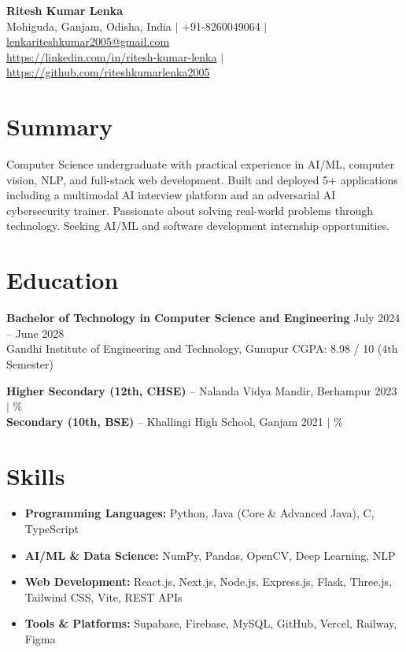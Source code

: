 \documentclass[a4paper,10pt]{article}
\begin{document}
\begin{center}
    {\LARGE \textbf{Ritesh Kumar Lenka}} \\[4pt]
    {\small
        Mohiguda, Ganjam, Odisha, India \quad $|$ \quad +91-8260049064 \quad $|$ \quad
        \href{mailto:lenkariteshkumar2005@gmail.com}{lenkariteshkumar2005@gmail.com}
    } \\[1pt]
    {\small
        \href{https://linkedin.com/in/ritesh-kumar-lenka}{https://linkedin.com/in/ritesh-kumar-lenka} \quad $|$ \quad
        \href{https://github.com/riteshkumarlenka2005}{https://github.com/riteshkumarlenka2005}
    }
\end{center}

\section{Summary}
Computer Science undergraduate with practical experience in AI/ML, computer vision, NLP, and full-stack web development. Built and deployed 5+ applications including a multimodal AI interview platform and an adversarial AI cybersecurity trainer. Passionate about solving real-world problems through technology. Seeking AI/ML and software development internship opportunities.

\section{Education}
\textbf{Bachelor of Technology in Computer Science and Engineering} \hfill July 2024 -- June 2028 \\
Gandhi Institute of Engineering and Technology, Gunupur \hfill CGPA: 8.98 / 10 (4th Semester)

\vspace{2pt}
\textbf{Higher Secondary (12th, CHSE)} -- Nalanda Vidya Mandir, Berhampur \hfill 2023 \quad $|$ \% \\
\textbf{Secondary (10th, BSE)} -- Khallingi High School, Ganjam \hfill 2021 \quad $|$ \%

\section{Skills}
\begin{itemize}[leftmargin=12pt, nosep]
    \item \textbf{Programming Languages:} Python, Java (Core \& Advanced Java), C, TypeScript
    \item \textbf{AI/ML \& Data Science:} NumPy, Pandas, OpenCV, Deep Learning, NLP
    \item \textbf{Web Development:} React.js, Next.js, Node.js, Express.js, Flask, Three.js, Tailwind CSS, Vite, REST APIs
    \item \textbf{Tools \& Platforms:} Supabase, Firebase, MySQL, GitHub, Vercel, Railway, Figma
\end{itemize}
\end{document}
